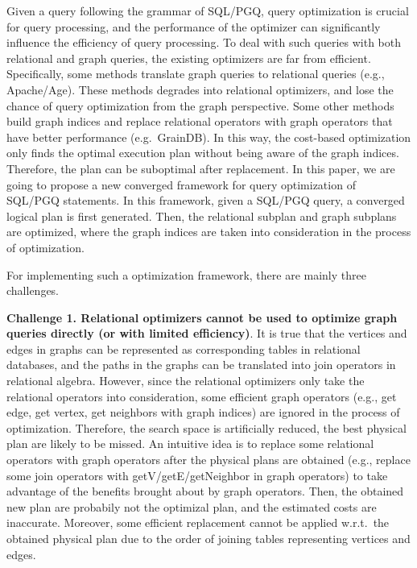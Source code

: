 Given a query following the grammar of SQL/PGQ, query optimization is crucial for query processing, and the performance of the optimizer can significantly influence the efficiency of query processing.
To deal with such queries with both relational and graph queries, the existing optimizers are far from efficient.
Specifically, some methods translate graph queries to relational queries (e.g., Apache/Age).
These methods degrades into relational optimizers, and lose the chance of query optimization from the graph perspective.
Some other methods build graph indices and replace relational operators with graph operators that have better performance (e.g.~GrainDB).
In this way, the cost-based optimization only finds the optimal execution plan without being aware of the graph indices.
Therefore, the plan can be suboptimal after replacement.
In this paper, we are going to propose a new converged framework for query optimization of SQL/PGQ statements. 
In this framework, given a SQL/PGQ query, a converged logical plan is first generated.
Then, the relational subplan and graph subplans are optimized, where the graph indices are taken into consideration in the process of optimization.

For implementing such a optimization framework, there are mainly three challenges.



\textbf{Challenge 1. Relational optimizers cannot be used to optimize graph queries directly (or with limited efficiency)}.
It is true that the vertices and edges in graphs can be represented as corresponding tables in relational databases, and the paths in the graphs can be translated into join operators in relational algebra.
However, since the relational optimizers only take the relational operators into consideration, some efficient graph operators (e.g., get edge, get vertex, get neighbors with graph indices) are ignored in the process of optimization.
Therefore, the search space is artificially reduced, the best physical plan are likely to be missed.
An intuitive idea is to replace some relational operators with graph operators after the physical plans are obtained (e.g., replace some join operators with getV/getE/getNeighbor in graph operators) to take advantage of the benefits brought about by graph operators.
Then, the obtained new plan are probabily not the optimizal plan, and the estimated costs are inaccurate.
Moreover, some efficient replacement cannot be applied w.r.t.~the obtained physical plan due to the order of joining tables representing vertices and edges.

